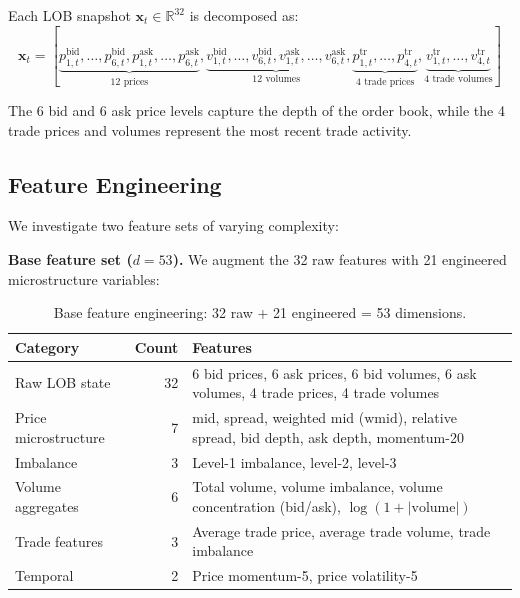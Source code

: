 \documentclass[11pt,a4paper]{article}
\newcommand{\R}{\mathbb{R}}
\newcommand{\bx}{\mathbf{x}}
\begin{document}
Each LOB snapshot $\bx_t \in \R^{32}$ is decomposed as:
\begin{equation}
    \bx_t = \left[\underbrace{p_{1,t}^{\text{bid}}, \ldots, p_{6,t}^{\text{bid}}, p_{1,t}^{\text{ask}}, \ldots, p_{6,t}^{\text{ask}}}_{12 \text{ prices}}, \underbrace{v_{1,t}^{\text{bid}}, \ldots, v_{6,t}^{\text{bid}}, v_{1,t}^{\text{ask}}, \ldots, v_{6,t}^{\text{ask}}}_{12 \text{ volumes}}, \underbrace{p_{1,t}^{\text{tr}}, \ldots, p_{4,t}^{\text{tr}}}_{4 \text{ trade prices}}, \underbrace{v_{1,t}^{\text{tr}}, \ldots, v_{4,t}^{\text{tr}}}_{4 \text{ trade volumes}}\right]
    \label{eq:raw_input}
\end{equation}

The 6 bid and 6 ask price levels capture the depth of the order book, while the 4 trade prices and volumes represent the most recent trade activity.

\subsection{Feature Engineering}
\label{sec:features}

We investigate two feature sets of varying complexity:

\textbf{Base feature set ($d = 53$).} We augment the 32 raw features with 21 engineered microstructure variables:

\begin{table}[h]
\centering
\small
\caption{Base feature engineering: 32 raw + 21 engineered = 53 dimensions.}
\label{tab:features_base}
\begin{tabularx}{\textwidth}{@{}lrX@{}}
\toprule
\textbf{Category} & \textbf{Count} & \textbf{Features} \\
\midrule
Raw LOB state & 32 & 6 bid prices, 6 ask prices, 6 bid volumes, 6 ask volumes, 4 trade prices, 4 trade volumes \\
\midrule
Price microstructure & 7 & mid, spread, weighted mid ($\text{wmid}$), relative spread, bid depth, ask depth, momentum-20 \\
Imbalance & 3 & Level-1 imbalance, level-2, level-3 \\
Volume aggregates & 6 & Total volume, volume imbalance, volume concentration (bid/ask), $\log(1+|\text{volume}|)$ \\
Trade features & 3 & Average trade price, average trade volume, trade imbalance \\
Temporal & 2 & Price momentum-5, price volatility-5 \\
\bottomrule
\end{tabularx}
\end{table}
\end{document}
